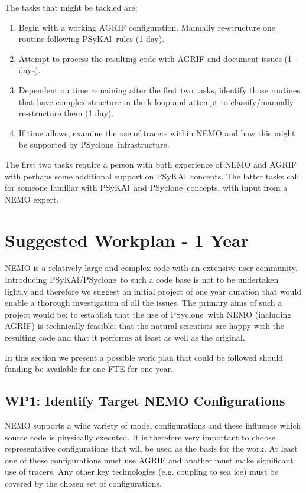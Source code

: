 \documentclass{article}
\newcommand{\psykal}{{PS}y{KA}l}
\newcommand{\psyclone}{{PS}yclone}
\begin{document}
The tasks that might be tackled are:
\begin{enumerate}

\item Begin with a working AGRIF configuration. Manually 
 re-structure one routine following \psykal\ rules (1 day).

\item Attempt to process the resulting code with AGRIF and 
 document issues (1+ days).

\item Dependent on time remaining after the first two tasks, identify
  those routines that have complex structure in the k loop and attempt
  to classify/manually re-structure them (1 day).

\item If time allows, examine the use of tracers within NEMO and how
  this might be supported by \psyclone\ infrastructure.

\end{enumerate}
The first two tasks require a person with both experience of NEMO and
AGRIF with perhaps some additional support on \psykal\ concepts.  The
latter tasks call for someone familiar with \psykal\ and \psyclone\
concepts, with input from a NEMO expert.

\section{Suggested Workplan - 1 Year}

NEMO is a relatively large and complex code with an extensive user
community. Introducing \psykal/\psyclone\ to such a code base is not to
be undertaken lightly and therefore we suggest an initial project of
one year duration that would enable a thorough investigation of all
the issues. The primary aims of such a project would be: to establish
that the use of \psyclone\ with NEMO (including AGRIF) is technically
feasible; that the natural scientists are happy with the resulting
code and that it performs at least as well as the original.

In this section we present a possible work plan that could be followed
should funding be available for one FTE for one year.

\subsection{WP1: Identify Target NEMO Configurations}
\label{wp1_target_configs}

NEMO supports a wide variety of model configurations and these
influence which source code is physically executed. It is therefore
very important to choose representative configurations that will be
used as the basis for the work. At least one of these configurations
must use AGRIF and another must make significant use of tracers.  Any
other key technologies (e.g. coupling to sea ice) must be covered by
the chosen set of configurations.
\end{document}
